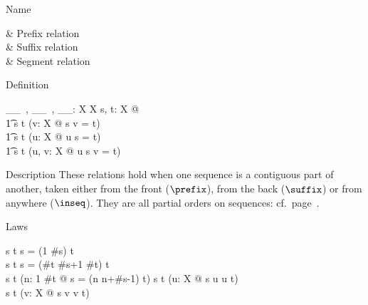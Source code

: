 \begin{manpage}\label{p:4065}
\item[Name]
\begin{name}
	\prefix	& Prefix relation \\
	\suffix	& Suffix relation \\
	\inseq	& Segment relation%
\end{name}

\item[Definition]
\begin{gendef}[X]
	\_\prefix\_~, \_\suffix\_~, \_\inseq\_:
		\seq X \rel \seq X
\where
	\forall s, t: \seq X @ \\
\t1		s \prefix t \iff (\exists v: \seq X @ s \cat v = t) \land \\
\t1		s \suffix t \iff (\exists u: \seq X @ u \cat s = t) \land \\
\t1		s \inseq t \iff (\exists u, v: \seq X @ u \cat s \cat v = t)
\end{gendef}

\item[Description]
These relations hold when one sequence is a contiguous part of
another, taken either from the front ($\prefix$), from the back
($\suffix$) or from anywhere ($\inseq$).  They are all partial
orders on sequences: cf.\ page~\pageref{p:80}.

\item[Laws]
\begin{laws}
	s \prefix t \iff s = (1 \upto \#s) \extract t \\
	s \suffix t \iff s = (\#t \minus \#s+1 \upto \#t) \extract t \\
	s \inseq t \iff
            (\exists n: 1 \upto \#t @ 
		s = (n \upto n+\#s-1) \extract t) %
\also
	s \inseq t \iff
	    (\exists u: \seq X @ s \suffix u \land u \prefix t) \\
	s \inseq t \iff
	    (\exists v: \seq X @ s \prefix v \land v \suffix t)
\end{laws}
\end{manpage}
